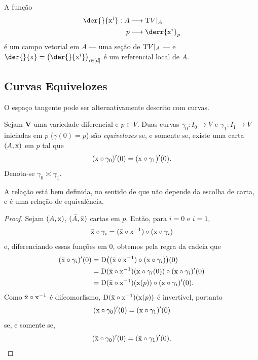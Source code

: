 A função
	\begin{align*}
	\func{\der{}{\x^i}}{A}{\Tg V|_A}{p}{\derr{\x^i}_p}
	\end{align*}
é um campo vetorial em $A$ --- uma seção de $\mathrm{T} V|_A$ --- e $\der{}{\x} = \left( \der{}{\x^i} \right)_{i \in [d]}$ é um referencial local de $A$.


\subsection{Curvas Equivelozes}

O espaço tangente pode ser alternativamente descrito com curvas.

\begin{defi}
Sejam $\bm V$ uma variedade diferencial e $p \in V$. Duas curvas $\gamma_0\colon I_0 \to V$ e $\gamma_1\colon I_1 \to V$ iniciadas em $p$ ($\gamma(0)=p$) são \emph{equivelozes} se, e somente se, existe uma carta $(A,\mathrm{x})$ em $p$ tal que
	\begin{equation*}
	(\mathrm{x} \circ \gamma_0)'(0) = (\mathrm{x} \circ \gamma_1)'(0).
	\end{equation*}
Denota-se $\gamma_0 \asymp \gamma_1$.
\end{defi}

A relação está bem definida, no sentido de que não depende da escolha de carta, e é uma relação de equivalência.

\begin{proof}
Sejam $(A,\mathrm{x})$, $(\bar A,\bar {\mathrm{x}})$ cartas em $p$. Então, para $i=0$ e $i=1$,
	\begin{equation*}
	\bar{\mathrm{x}} \circ \gamma_i = (\bar{\mathrm{x}} \circ \mathrm{x}^{-1}) \circ (\mathrm{x} \circ \gamma_i)
	\end{equation*}
e, diferenciando essas funções em $0$, obtemos pela regra da cadeia que
	\begin{align*}
	(\bar{\mathrm{x}} \circ \gamma_i)'(0) &= \mathrm{D} \big( (\bar{\mathrm{x}} \circ \mathrm{x}^{-1}) \circ (\mathrm{x} \circ \gamma_i) \big)(0) \\
	&= \mathrm{D}(\bar{\mathrm{x}} \circ \mathrm{x}^{-1})(\mathrm{x} \circ \gamma_i(0)) \circ (\mathrm{x} \circ \gamma_i)'(0) \\
	&=  \mathrm{D}(\bar{\mathrm{x}} \circ \mathrm{x}^{-1})(\mathrm{x}(p)) \circ (\mathrm{x} \circ \gamma_i)'(0).
	\end{align*}
Como $\bar{\mathrm{x}} \circ \mathrm{x}^{-1}$ é difeomorfismo, $\mathrm{D}(\bar{\mathrm{x}} \circ \mathrm{x}^{-1})(\mathrm{x}(p))$ é invertível, portanto
	\begin{equation*}
	(\mathrm{x} \circ \gamma_0)'(0) = (\mathrm{x} \circ \gamma_1)'(0)
	\end{equation*}
se, e somente se,
	\begin{equation*}
	(\bar{\mathrm{x}} \circ \gamma_0)'(0) = (\bar{\mathrm{x}} \circ \gamma_1)'(0).
	\end{equation*}
\end{proof}


